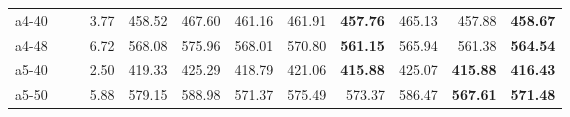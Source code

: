 \documentclass[aspectratio=1610]{beamer}
\begin{document}
\begin{frame}
\begin{table}[]
{\begin{tabular}{lrrrrrrrrrrr}
a4-40                                          &              & \multicolumn{1}{r|}{}                                       & 3.77              & 458.52          & \multicolumn{1}{r|}{467.60}                                 & 461.16          & \multicolumn{1}{r|}{461.91}   & \textbf{457.76} & \multicolumn{1}{r|}{465.13}                                 & 457.88          & {\color[HTML]{FE0000} \textbf{458.67}} \\
a4-48                                          &              & \multicolumn{1}{r|}{}                                       & 6.72              & 568.08          & \multicolumn{1}{r|}{575.96}                                 & 568.01          & \multicolumn{1}{r|}{570.80}   & \textbf{561.15} & \multicolumn{1}{r|}{565.94}                                 & 561.38          & {\color[HTML]{FE0000} \textbf{564.54}} \\
a5-40                                          &              & \multicolumn{1}{r|}{}                                       & 2.50              & 419.33          & \multicolumn{1}{r|}{425.29}                                 & 418.79          & \multicolumn{1}{r|}{421.06}   & \textbf{415.88} & \multicolumn{1}{r|}{425.07}                                 & \textbf{415.88} & {\color[HTML]{FE0000} \textbf{416.43}} \\
a5-50                                          &              & \multicolumn{1}{r|}{}                                       & 5.88              & 579.15          & \multicolumn{1}{r|}{588.98}                                 & 571.37          & \multicolumn{1}{r|}{575.49}   & 573.37          & \multicolumn{1}{r|}{586.47}                                 & \textbf{567.61} & {\color[HTML]{FE0000} \textbf{571.48}} \\ \hline
\end{tabular}%
}
\end{table}

\end{frame}


  
\end{document}
